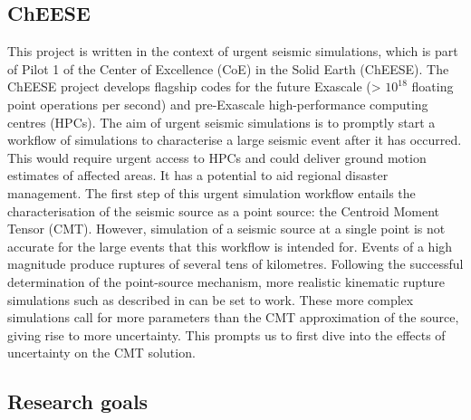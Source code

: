 \documentclass[../Text/00main.tex]{subfiles}
\begin{document}
\subsection{ChEESE}

This project is written in the context of urgent seismic simulations, which is part of Pilot 1 of the Center of Excellence (CoE) in the Solid Earth (ChEESE). The ChEESE project develops flagship codes for the future Exascale (> $10^{18}$ floating point operations per second) and pre-Exascale high-performance computing centres (HPCs). The aim of urgent seismic simulations is to promptly start a workflow of simulations to characterise a large seismic event after it has occurred. This would require urgent access to HPCs and could deliver ground motion estimates of affected areas. It has a potential to aid regional disaster management. The first step of this urgent simulation workflow entails the characterisation of the seismic source as a point source: the Centroid Moment Tensor (CMT). However, simulation of a seismic source at a single point is not accurate for the large events that this workflow is intended for. Events of a high magnitude produce ruptures of several tens of kilometres. Following the successful determination of the point-source mechanism, more realistic kinematic rupture simulations such as described in  \citet{graves_kinematic_2016} can be set to work. These more complex simulations call for more parameters than the CMT approximation of the source, giving rise to more uncertainty. This prompts us to first dive into the effects of uncertainty on the CMT solution. 

\subsection{Research goals}
\end{document}

